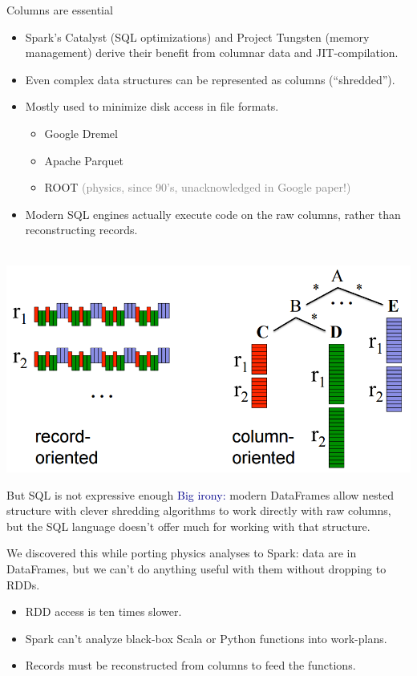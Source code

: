 \documentclass{beamer}
\begin{document}
\begin{frame}{Columns are essential}
\vspace{-1.5 cm}
\begin{itemize}\setlength{\itemsep}{0.25 cm}
\item Spark's Catalyst (SQL optimizations) and Project Tungsten (memory management) derive their benefit from columnar data and JIT-compilation.
\item \begin{minipage}[t]{0.5\linewidth}Even complex data structures can be represented as columns (``shredded'').\end{minipage}
\item \begin{minipage}[t]{0.5\linewidth}Mostly used to minimize disk access in file formats.\end{minipage}

\vspace{0.1 cm}
\begin{itemize}
\item Google Dremel
\item Apache Parquet
\item ROOT \textcolor{gray}{(physics, since 90's, unacknowledged in Google paper!)}
\end{itemize}

\item Modern SQL engines actually execute code on the raw columns, rather than reconstructing records.
\end{itemize}

\vspace{-5 cm}
\mbox{ } \hfill \includegraphics[width=0.4\linewidth]{columnar.png}
\end{frame}

\begin{frame}{But SQL is not expressive enough}
\vspace{0.5 cm}
\textcolor{darkblue}{Big irony:} modern DataFrames allow nested structure with clever shredding algorithms to work directly with raw columns, but the SQL language doesn't offer much for working with that structure.

\vspace{0.5 cm}
We discovered this while porting physics analyses to Spark: data are in DataFrames, but we can't do anything useful with them without dropping to RDDs.

\vspace{0.5 cm}
\begin{itemize}
\item RDD access is ten times slower.
\item Spark can't analyze black-box Scala or Python functions into work-plans.
\item Records must be reconstructed from columns to feed the functions.
\end{itemize}
\end{frame}
\end{document}
